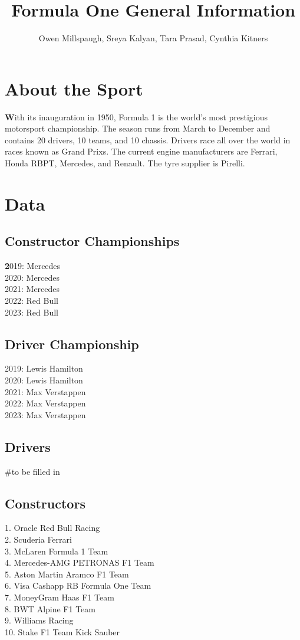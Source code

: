 \documentclass[12pt]{article}
\title{Formula One General Information}
\author{Owen Millspaugh, Sreya Kalyan, Tara Prasad, Cynthia Kitners}
\begin{document}
\maketitle

\section{About the Sport}
\textbf With its inauguration in 1950, Formula 1 is the world's most prestigious motorsport championship. 
The season runs from March to December and contains 20 drivers, 10 teams, and 10 chassis.
Drivers race all over the world in races known as Grand Prixs.
The current engine manufacturers are Ferrari, Honda RBPT, Mercedes, and Renault. 
The tyre supplier is Pirelli.
\section{Data}
\subsection{Constructor Championships}
\textbf 2019: Mercedes\\
2020: Mercedes\\
2021: Mercedes\\
2022: Red Bull\\
2023: Red Bull
\subsection{Driver Championship}
2019: Lewis Hamilton\\
2020: Lewis Hamilton\\
2021: Max Verstappen\\
2022: Max Verstappen\\
2023: Max Verstappen
\subsection{Drivers}

#to be filled in

\subsection{Constructors}
1. Oracle Red Bull Racing\\
2. Scuderia Ferrari\\
3. McLaren Formula 1 Team\\
4. Mercedes-AMG PETRONAS F1 Team\\
5. Aston Martin Aramco F1 Team\\
6. Visa Cashapp RB Formula One Team\\
7. MoneyGram Haas F1 Team\\
8. BWT Alpine F1 Team\\
9. Williams Racing\\
10. Stake F1 Team Kick Sauber
\end{document}
